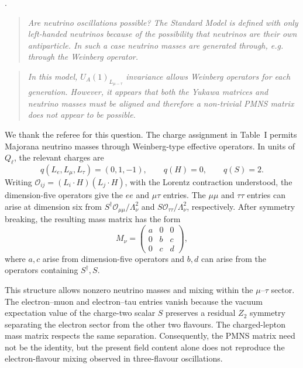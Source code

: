 \documentclass[12pt,a4paper]{article}
\begin{document}
\medskip
{}.

\begin{quote}\itshape
Are neutrino oscillations possible? The Standard Model is defined with only left-handed neutrinos because of the possibility that neutrinos are their own antiparticle. In such a case neutrino masses are generated through, e.g. through the Weinberg operator.
\end{quote}

\medskip
{}

\begin{quote}\itshape
In this model, \(U_A(1)_{L_{\mu-\tau}}\) invariance allows Weinberg operators for each generation. However, it appears that both the Yukawa matrices and neutrino masses must be aligned and therefore a non-trivial PMNS matrix does not appear to be possible.
\end{quote}


We thank the referee for this question. The charge assignment in Table~I permits Majorana neutrino masses through Weinberg-type effective operators. In units of \(Q_\ell\), the relevant charges are
\[
q(L_e,L_\mu,L_\tau)=(0,1,-1),\qquad q(H)=0,\qquad q(S)=2.
\]
Writing \(\mathcal O_{ij}=(L_i\!\cdot H)(L_j\!\cdot H)\), with the Lorentz contraction understood, the dimension-five operators give the \(ee\) and \(\mu\tau\) entries. The \(\mu\mu\) and \(\tau\tau\) entries can arise at dimension six from \(S^\dagger\mathcal O_{\mu\mu}/\Lambda_\nu^2\) and \(S\mathcal O_{\tau\tau}/\Lambda_\nu^2\), respectively. After symmetry breaking, the resulting mass matrix has the form
\[
M_\nu=
\begin{pmatrix}
a&0&0\\
0&b&c\\
0&c&d
\end{pmatrix},
\]
where \(a,c\) arise from dimension-five operators and \(b,d\) can arise from the operators containing \(S^\dagger,S\).

This structure allows nonzero neutrino masses and mixing within the \(\mu\)--\(\tau\) sector. The electron--muon and electron--tau entries vanish because the vacuum expectation value of the charge-two scalar \(S\) preserves a residual \(Z_2\) symmetry separating the electron sector from the other two flavours. The charged-lepton mass matrix respects the same separation. Consequently, the PMNS matrix need not be the identity, but the present field content alone does not reproduce the electron-flavour mixing observed in three-flavour oscillations.
\end{document}
